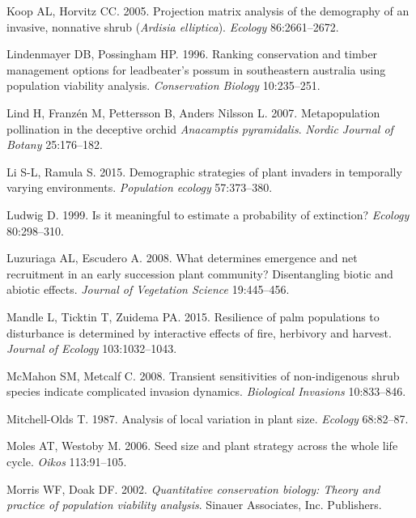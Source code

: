 \documentclass[
  12pt,
  letterpaper,
]{book}
\newlength{\cslhangindent}
\newenvironment{CSLReferences}[2] %
 {\begin{list}{}{%
  \setlength{\itemindent}{0pt}
  \setlength{\leftmargin}{0pt}
  \setlength{\parsep}{0pt}
  \ifodd #1
   \setlength{\leftmargin}{\cslhangindent}
   \setlength{\itemindent}{-1\cslhangindent}
  \fi
  \setlength{\itemsep}{#2\baselineskip}}}
 {\end{list}}
\begin{document}
\begin{CSLReferences}{1}{0}
Koop AL, Horvitz CC. 2005. Projection matrix analysis of the demography
of an invasive, nonnative shrub (\emph{{A}rdisia {e}lliptica}).
\emph{Ecology} 86:2661--2672.

Lindenmayer DB, Possingham HP. 1996. Ranking conservation and timber
management options for leadbeater's possum in southeastern australia
using population viability analysis. \emph{Conservation Biology}
10:235--251.

Lind H, Franzén M, Pettersson B, Anders Nilsson L. 2007. Metapopulation
pollination in the deceptive orchid \emph{{A}nacamptis {p}yramidalis}.
\emph{Nordic Journal of Botany} 25:176--182.

Li S-L, Ramula S. 2015. Demographic strategies of plant invaders in
temporally varying environments. \emph{Population ecology} 57:373--380.

Ludwig D. 1999. Is it meaningful to estimate a probability of
extinction? \emph{Ecology} 80:298--310.

Luzuriaga AL, Escudero A. 2008. What determines emergence and net
recruitment in an early succession plant community? Disentangling biotic
and abiotic effects. \emph{Journal of Vegetation Science} 19:445--456.

Mandle L, Ticktin T, Zuidema PA. 2015. Resilience of palm populations to
disturbance is determined by interactive effects of fire, herbivory and
harvest. \emph{Journal of Ecology} 103:1032--1043.

McMahon SM, Metcalf C. 2008. Transient sensitivities of non-indigenous
shrub species indicate complicated invasion dynamics. \emph{Biological
Invasions} 10:833--846.

Mitchell-Olds T. 1987. Analysis of local variation in plant size.
\emph{Ecology} 68:82--87.

Moles AT, Westoby M. 2006. Seed size and plant strategy across the whole
life cycle. \emph{Oikos} 113:91--105.

Morris WF, Doak DF. 2002. \emph{Quantitative conservation biology:
Theory and practice of population viability analysis}. Sinauer
Associates, Inc. Publishers.


\end{CSLReferences}
\end{document}
